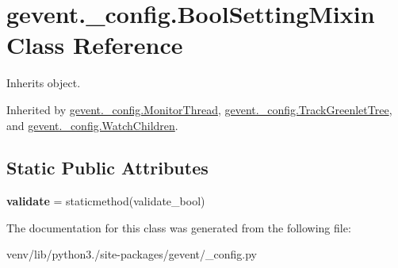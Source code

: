 \hypertarget{classgevent_1_1__config_1_1_bool_setting_mixin}{}\section{gevent.\+\_\+config.\+Bool\+Setting\+Mixin Class Reference}
\label{classgevent_1_1__config_1_1_bool_setting_mixin}


Inherits object.



Inherited by \hyperlink{classgevent_1_1__config_1_1_monitor_thread}{gevent.\+\_\+config.\+Monitor\+Thread}, \hyperlink{classgevent_1_1__config_1_1_track_greenlet_tree}{gevent.\+\_\+config.\+Track\+Greenlet\+Tree}, and \hyperlink{classgevent_1_1__config_1_1_watch_children}{gevent.\+\_\+config.\+Watch\+Children}.

\subsection*{Static Public Attributes}
\begin{DoxyCompactItemize}
\item 
\mbox{\label{classgevent_1_1__config_1_1_bool_setting_mixin_a8d3793b1fbe56cf718802934c0e2c33c}} 
{\bfseries validate} = staticmethod(validate\+\_\+bool)
\end{DoxyCompactItemize}


The documentation for this class was generated from the following file\+:\begin{DoxyCompactItemize}
\item 
venv/lib/python3./site-\/packages/gevent/\+\_\+config.\+py\end{DoxyCompactItemize}
